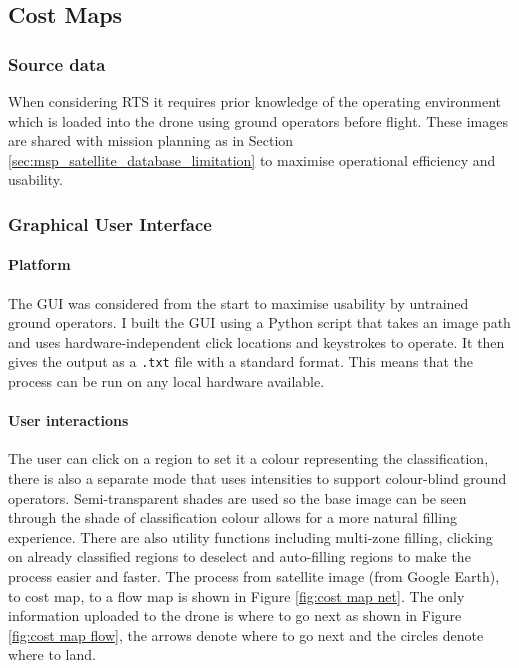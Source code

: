 \subsection{Cost Maps}\label{sub_section:tgt_cost_maps}
\subsubsection{Source data}\label{sub_sub_section:tgt_source_data}
When considering \gls{RTS} it requires prior knowledge of the operating environment which is loaded into the drone using ground operators before flight. These images are shared with mission planning as in Section \ref{sec:msp_satellite_database_limitation} to maximise operational efficiency and usability. 

\subsubsection{Graphical User Interface}\label{sub_sub_section:tgt_GUI}
\paragraph{Platform} 
The \gls{GUI} was considered from the start to maximise usability by untrained ground operators. I built the \gls{GUI} using a Python script that takes an image path and uses hardware-independent click locations and keystrokes to operate. It then gives the output as a \texttt{.txt} file with a standard format. This means that the process can be run on any local hardware available.
\paragraph{User interactions}
The user can click on a region to set it a colour representing the classification, there is also a separate mode that uses intensities to support colour-blind ground operators. Semi-transparent shades are used so the base image can be seen through the shade of classification colour allows for a more natural filling experience. There are also utility functions including multi-zone filling, clicking on already classified regions to deselect and auto-filling regions to make the process easier and faster. The process from satellite image (from Google Earth), to cost map, to a flow map is shown in Figure \ref{fig:cost map net}. The only information uploaded to the drone is where to go next as shown in Figure \ref{fig:cost map flow}, the arrows denote where to go next and the circles denote where to land.

